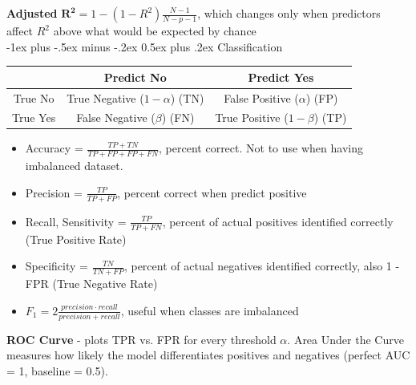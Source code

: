 \documentclass[10pt,landscape]{article}
\makeatletter
\renewcommand{\subsection}{\@startsection{subsection}{2}{0mm}%
                                {-1ex plus -.5ex minus -.2ex}%
                                {0.5ex plus .2ex}%
                                {\normalfont\normalsize\bfseries}}
\makeatother
\begin{document}
\begin{multicols}{3}
    \textbf{Adjusted} $\boldsymbol{R^2} = 1 - (1-R^2)\frac{N-1}{N-p-1}$, which changes only when predictors affect $R^2$ above what would be expected by chance\\

    \renewcommand{\tabcolsep}{5pt}
    \subsection{Classification}
    \begin{center}
        \footnotesize
        \begin{tabular}{ |c|c|c| }
            \hline
                       & Predict No                  & Predict Yes                       \\
            \hline
            True No  & \thead{True Negative ($1-\alpha$)\\(TN)}& \thead{False Positive ($\alpha$) \\ (FP) } \\
            True Yes & \thead{False Negative ($\beta$) \\ (FN)}& \thead{True Positive ($1-\beta$) \\ (TP) } \\
            \hline
        \end{tabular}
    \end{center}
    \vspace{-1mm}
    \begin{itemize}[label={--},leftmargin=4mm]
        \vspace{-1mm}
        \itemsep -.4mm
        \item Accuracy = $\frac{TP + TN}{TP + FP + FP + FN}$, percent correct. Not to use when having imbalanced dataset. 
        \item Precision = $\frac{TP}{TP + FP}$, percent correct when predict positive
        \item Recall, Sensitivity = $\frac{TP}{TP + FN}$, percent of actual positives identified correctly (True Positive Rate)
        \item Specificity = $\frac{TN}{TN + FP}$, percent of actual negatives identified correctly, also 1 - FPR (True Negative Rate)
        \item $F_1 = 2\frac{precision\cdot recall}{precision + recall}$, useful when classes are imbalanced
    \end{itemize}


    \textbf{ROC Curve} - plots TPR vs. FPR for every threshold $\alpha$. Area Under the Curve  measures how likely the model differentiates positives and negatives (perfect AUC = 1, baseline = 0.5).


\end{multicols}
\end{document}

